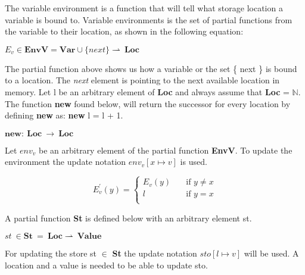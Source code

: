   The variable environment is a function that will tell what storage location a variable is bound to. Variable environments  is the set of partial functions  from the variable to their location, as shown in the following equation:
  
  \begin{math}  
	 E_v \in \boldsymbol{EnvV} = \boldsymbol{Var} \cup \{ next \} \rightharpoonup \ \boldsymbol{Loc}
  \end{math}
  
  The partial function above shows us how a variable or the set \{ next \} is bound to a location. The \textit{next} element is pointing to the next available location in memory.
  Let l be an arbitrary element of \textbf{Loc} and always assume that \textbf{Loc} = \begin{math} \mathbb{N}. \end{math} The function \textbf{new} found below, will return the successor for every location by defining \textbf{new} as: \textbf{new} l = l + 1.
  
  \begin{math}
	  \boldsymbol{new} : \ \boldsymbol{Loc} \ \rightarrow \ \boldsymbol{Loc}
  \end{math}
  
  Let \begin{math}env_v\end{math} be an arbitrary element of the partial function \textbf{EnvV}. To update the environment the update notation \begin{math}env_v [x \mapsto v] \end{math} is used. 
  
  \[ E^{'}_v(y) =
      \begin{cases}
        E_v(y)       & \quad \text{if } y \not= x\\
        l  & \quad \text{if } y = x\\
      \end{cases}
    \]
      
  A partial function \textbf{St} is defined below with an arbitrary element st.
  
  \begin{math}
	  st \ \in \boldsymbol{St} \ = \ \boldsymbol{Loc} \rightharpoonup \ \boldsymbol{Value}
  \end{math}
  
  For updating the store st \begin{math} \in \end{math} \textbf{St} the update notation \begin{math} sto[l \mapsto v] \end{math} will be used. A location and a value is needed to be able to update sto.
  
